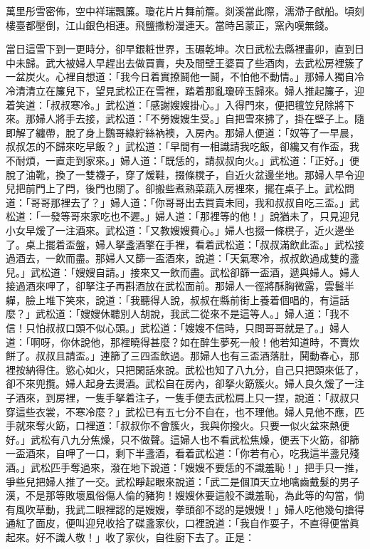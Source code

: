 \begin{myquote}
萬里彤雪密佈，空中祥瑞飄簾。瓊花片片舞前簷。剡溪當此際，濡滯子猷船。頃刻樓臺都壓倒，江山銀色相連。飛鹽撒粉漫連天。當時呂蒙正，窯內嘆無錢。
\end{myquote}

當日這雪下到一更時分，卻早銀粧世界，玉碾乾坤。次日武松去縣裡畫卯，直到日中未歸。武大被婦人早趕出去做買賣，央及間壁王婆買了些酒肉，{}去武松房裡簇了一盆炭火。心裡自想道：「我今日着實撩鬪他一鬪，不怕他不動情。」那婦人獨自冷冷清清立在簾兒下，望見武松正在雪裡，踏着那亂瓊碎玉歸來。婦人推起簾子，迎着笑道：「叔叔寒冷。」武松道：「感謝嫂嫂掛心。」入得門來，便把氊笠兒除將下來。那婦人將手去接，武松道：「不勞嫂嫂生受。」自把雪來拂了，{}掛在壁子上。隨即解了纏帶，脫了身上鸚哥綠紵絲衲襖，入房內。那婦人便道：「奴等了一早晨，叔叔怎的不歸來吃早飯？」武松道：「早間有一相識請我吃飯，卻纔又有作盃，我不耐煩，一直走到家來。」婦人道：「既恁的，請叔叔向火。」武松道：「正好。」便脫了油靴，換了一雙襪子，穿了煖鞋，掇條櫈子，自近火盆邊坐地。{}那婦人早令迎兒把前門上了閂，後門也關了。卻搬些煮熟菜蔬入房裡來，擺在桌子上。武松問道：「哥哥那裡去了？」婦人道：「你哥哥出去買賣未囘，我和叔叔自吃三盃。」武松道：「一發等哥來家吃也不遲。」婦人道：「那裡等的他！」說猶未了，只見迎兒小女早煖了一注酒來。武松道：「又教嫂嫂費心。」婦人也掇一條櫈子，近火邊坐了。桌上擺着盃盤，婦人拏盞酒擎在手裡，看着武松道：「叔叔滿飲此盃。」武松接過酒去，一飲而盡。那婦人又篩一盃酒來，說道：「天氣寒冷，叔叔飲過成雙的盞兒。」{}武松道：「嫂嫂自請。」接來又一飲而盡。武松卻篩一盃酒，遞與婦人。婦人接過酒來呷了，卻拏注子再斟酒放在武松面前。那婦人一徑將酥胸微露，雲鬟半軃，{}臉上堆下笑來，說道：「我聽得人說，叔叔在縣前街上養着個唱的，有這話麼？」{}武松道：「嫂嫂休聽別人胡說，我武二從來不是這等人。」{}婦人道：「我不信！只怕叔叔口頭不似心頭。」武松道：「嫂嫂不信時，只問哥哥就是了。」婦人道：「啊呀，你休說他，那裡曉得甚麼？{}如在醉生夢死一般！{}他若知道時，不賣炊餅了。叔叔且請盃。」連篩了三四盃飲過。那婦人也有三盃酒落肚，鬨動春心，那裡按納得住。慾心如火，只把閑話來說。武松也知了八九分，自己只把頭來低了，卻不來兜攬。婦人起身去燙酒。武松自在房內，卻拏火筯簇火。{}婦人良久煖了一注子酒來，到房裡，一隻手拏着注子，一隻手便去武松肩上只一捏，說道：「叔叔只穿這些衣裳，不寒冷麼？」武松已有五七分不自在，也不理他。{}婦人見他不應，匹手就來奪火筯，口裡道：「叔叔你不會簇火，我與你撥火。只要一似火盆來熱便好。」武松有八九分焦燥，只不做聲。這婦人也不看武松焦燥，{}便丟下火筯，卻篩一盃酒來，自呷了一口，剩下半盞酒，看着武松道：「你若有心，吃我這半盞兒殘酒。」武松匹手奪過來，{}潑在地下說道：「嫂嫂不要恁的不識羞恥！」{}把手只一推，爭些兒把婦人推了一交。{}武松睜起眼來說道：「武二是個頂天立地噙齒戴髮的男子漢，不是那等敗壞風俗傷人倫的豬狗！{}嫂嫂休要這般不識羞恥，為此等的勾當，倘有風吹草動，我武二眼裡認的是嫂嫂，拳頭卻不認的是嫂嫂！」{}婦人吃他幾句搶得通紅了面皮，便叫迎兒收拾了碟盞家伙，{}口裡說道：「我自作耍子，不直得便當眞起來。好不識人敬！」{}收了家伙，自徃廚下去了。正是：

